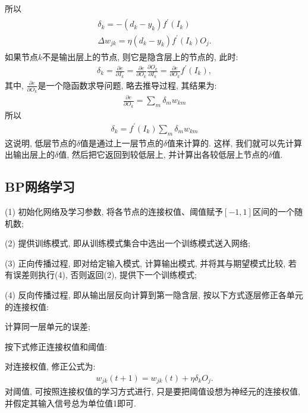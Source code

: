 所以
\begin{align*}
  \begin{array}{l}{\delta_{k}=-\left(d_{k}-y_{k}\right) f^{\prime}\left(I_{k}\right)} \\
        \Delta w_{j k}=\eta\left(d_{k}-y_{k}\right) f^{\prime}\left(I_{k}\right) O_{j}.
  \end{array}
\end{align*}
如果节点$k$不是输出层上的节点, 则它是隐含层上的节点的, 此时:
\begin{align*}
    \delta_{k}=\frac{\partial e}{\partial I_{k}}=\frac{\partial e}{\partial O_{k}} \frac{\partial O_{k}}{\partial I_{k}}=\frac{\partial e}{\partial O_{k}} f^{\prime}\left(I_{k}\right),
\end{align*}
其中, $\frac{\partial e}{\partial O_{k}}$是一个隐函数求导问题, 略去推导过程, 其结果为:
\begin{align*}
    \frac{\partial e}{\partial O_{k}}=\sum_{m} \delta_{m} w_{k m}
\end{align*}
所以
\begin{align*}
    \delta_{k}=f^{\prime}\left(I_{k}\right) \sum_{m} \delta_{m} w_{k m}
\end{align*}
这说明, 低层节点的$\delta$值是通过上一层节点的$\delta$值来计算的. 这样, 我们就可以先计算出输出层上的$\delta$值, 然后把它返回到较低层上, 并计算出各较低层上节点的$\delta$值.
\subsection{BP网络学习}

(1) 初始化网络及学习参数, 将各节点的连接权值、阈值赋予$[-1, 1]$区间的一个随机数;

(2) 提供训练模式, 即从训练模式集合中选出一个训练模式送入网络;

(3) 正向传播过程, 即对给定输入模式, 计算输出模式, 并将其与期望模式比较, 若有误差则执行(4), 否则返回(2), 提供下一个训练模式;

(4) 反向传播过程, 即从输出层反向计算到第一隐含层, 按以下方式逐层修正各单元的连接权值:

    \quad {} 计算同一层单元的误差;

    \quad {} 按下式修正连接权值和阈值:

    \quad 对连接权值, 修正公式为:
        \begin{align}
            w_{j k}(t+1)=w_{j k}(t)+\eta \delta_{k} O_{j}.
        \end{align}
    对阈值, 可按照连接权值的学习方式进行, 只是要把阈值设想为神经元的连接权值, 并假定其输入信号总为单位值1即可.


